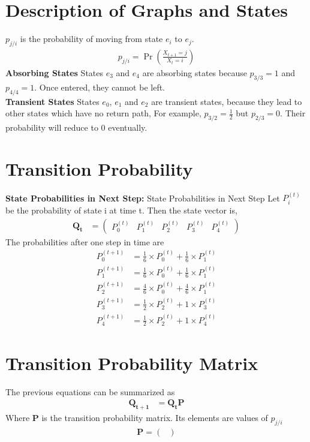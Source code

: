 \documentclass[journal,12pt,two column]{IEEEtran}
\providecommand{\pr}[1]{\ensuremath{\Pr\left(#1\right)}}
\providecommand{\pr}[1]{\ensuremath{\Pr\left(#1\right)}}
\providecommand{\prt}[2]{\ensuremath{P_{#1}^{\left(#2\right)} }}        %
\theoremstyle{remark}
\newcommand{\myvec}[1]{\ensuremath{\begin{pmatrix}#1\end{pmatrix}}}
\let\vec\mathbf
\begin{document}
\section{Description of Graphs and States}
 $p_{j/i}$ is the probability of moving from state $e_i$ to $e_j$.
    \begin{align}
    p_{j/i} = \pr{\frac{ X_{t+1}=j } {X_t=i} }
    \end{align}
    \textbf{Absorbing States}
    States $e_3$ and $e_4$ are absorbing states because $p_{3/3}=1$ and $p_{4/4}=1$. Once entered, they cannot be left.\\
    \textbf{Transient States}
    States $e_0$, $e_1$ and $e_2$ are transient states, because they lead to other states which have no return path, For example, $p_{3/2}=\frac{1}{2}$ but $p_{2/3}= 0$. Their probability will reduce to 0 eventually.   
\section{Transition Probability}
\textbf{State Probabilities in Next Step:}
{State Probabilities in Next Step}
    Let $\prt{i}{t}$ be the probability of state i at time t. 
    Then the state vector is,   
    \begin{align}
        \vec{Q_t} &= \myvec{\prt{0}{t} & \prt{1}{t} & \prt{2}{t} & \prt{3}{t} & \prt{4}{t} }
    \end{align}    
    The probabilities after one step in time are
    \begin{align}
       \prt{0}{t+1} &= \frac{1}{6} \times \prt{0}{t} + \frac{1}{6} \times \prt{1}{t} \\
       \prt{1}{t+1} &= \frac{1}{6} \times \prt{0}{t} + \frac{1}{6} \times \prt{1}{t} \\
       \prt{2}{t+1} &= \frac{4}{6} \times \prt{0}{t} + \frac{4}{6} \times \prt{1}{t} \\
       \prt{3}{t+1} &= \frac{1}{2} \times \prt{2}{t} + 1 \times \prt{3}{t} \\
       \prt{4}{t+1} &= \frac{1}{2} \times \prt{2}{t} + 1 \times \prt{4}{t} 
    \end{align}
    
\section{Transition Probability Matrix}

    The previous equations can be summarized as
    \begin{align}
        \vec{Q_{t+1}} &= \vec{Q_t} \vec{P}  
        \label{eq:transtition}
    \end{align}
    Where $\vec{P}$ is the transition probability matrix. Its elements are values of $p_{j/i}$
    \begin{align}
        \vec{P}= \myvec{} 
    \end{align}
\end{document}
